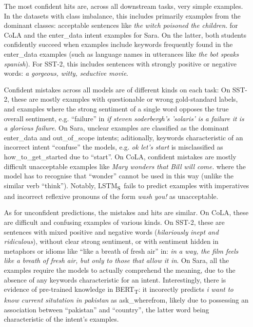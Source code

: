 \documentclass[bsc,frontabs,twoside,singlespacing,parskip,deptreport]{infthesis}
\def\BERTT{BERT\textsubscript{T}}
\def\LSTMS{LSTM\textsubscript{S}}
\begin{document}
{{{      The most confident hits are, across all downstream tasks, very simple examples. In the datasets with class imbalance, this includes primarily examples from the dominant classes: acceptable sentences like \textit{the witch poisoned the children.} for CoLA and the enter\_data intent examples for Sara. On the latter, both students confidently succeed when examples include keywords frequently found in the enter\_data examples (such as language names in utterances like \textit{the bot speaks spanish}).
      For SST-2, this includes sentences with strongly positive or negative words: \textit{a gorgeous, witty, seductive movie}.
      
      Confident mistakes across all models are of different kinds on each task: On SST-2, these are mostly examples with questionable or wrong gold-standard labels, and examples where the strong sentiment of a single word opposes the true overall sentiment, e.g. ``failure'' in \textit{if steven soderbergh's 'solaris' is a failure it is a glorious failure}. On Sara, unclear examples are classified as the dominant enter\_data and out\_of\_scope intents; aditionally, keywords characteristic of an incorrect intent ``confuse'' the models, e.g. \textit{ok let's start} is misclassified as how\_to\_get\_started due to ``start''. On CoLA, confident mistakes are mostly difficult unacceptable examples like \textit{Mary wonders that Bill will come.} where the model has to recognise that ``wonder'' cannot be used in this way (unlike the similar verb ``think''). Notably, \LSTMS~fails to predict examples with imperatives and incorrect reflexive pronouns of the form \textit{wash you!} as unacceptable.

      As for unconfident predictions, the mistakes and hits are similar. On CoLA, these are difficult and confusing examples of various kinds. On SST-2, these are sentences with mixed positive and negative words (\textit{hilariously inept and ridiculous}), without clear strong sentiment, or with sentiment hidden in metaphors or idioms like ``like a breath of fresh air'' in: \textit{in a way, the film feels like a breath of fresh air, but only to those that allow it in}. On Sara, all the examples require the models to actually comprehend the meaning, due to the absence of any keywords characteristic for an intent. Interestingly, there is evidence of pre-trained knowledge in \BERTT: it incorectly predicts \textit{i want to know current situtation in pakistan} as ask\_wherefrom, likely due to possessing an association between ``pakistan'' and ``country'', the latter word being characteristic of the intent's examples.

}}}
\end{document}
